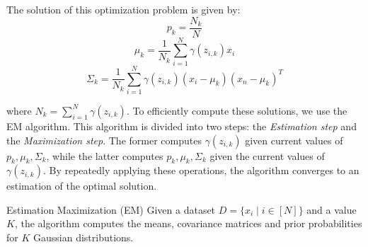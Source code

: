 \documentclass[a4paper, 12pt]{report}
\begin{document}
    The solution of this optimization problem is given by:
    \[p_k = \frac{N_k}{N}\]
    \[\mu_k = \frac{1}{N_k} \sum_{i = 1}^N \gamma(z_{i,k}) x_i\]
    \[\Sigma_k = \frac{1}{N_k} \sum_{i = 1}^N \gamma(z_{i,k}) (x_i - \mu_k)(x_n - \mu_k)^T\]

    where $N_k = \sum_{i = 1}^N \gamma(z_{i,k})$. To efficiently compute these solutions, we use the EM algorithm. This algorithm is divided into two steps: the \textit{Estimation step} and the \textit{Maximization step}. The former computes $\gamma(z_{i,k})$ given current values of $p_k, \mu_k, \Sigma_k$, while the latter computes $p_k, \mu_k, \Sigma_k$ given the current values of $\gamma(z_{i,k})$. By repeatedly applying these operations, the algorithm converges to an estimation of the optimal solution.

    \begin{framedalgo}{Estimation Maximization (EM)}
        Given a dataset $D = \{x_i \mid i \in [N]\}$ and a value $K$, the algorithm computes the means, covariance matrices and prior probabilities for $K$ Gaussian distributions.

        \begin{algorithmic}
                \EndWhile

            \EndFunction
        \end{algorithmic}
    \end{framedalgo}
\end{document}
